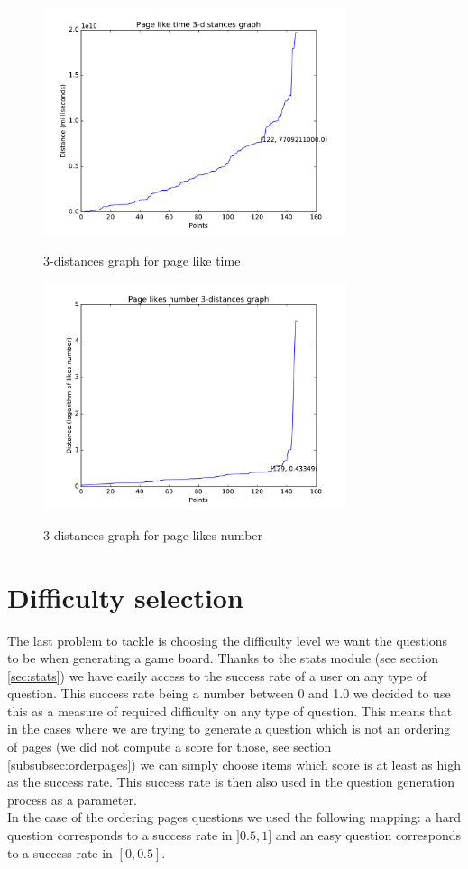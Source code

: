 \begin{figure}
\centering
{\includegraphics[width=3.5in]{images/page_like_time_knn.pdf}}
\caption{3-distances graph for page like time}
\label{fig:plikeTime}
\end{figure}
\begin{figure}
\centering
{\includegraphics[width=3.5in]{images/page_likes_number_knn.pdf}}
\caption{3-distances graph for page likes number}
\label{fig:plikesNumber}
\end{figure}

\section{Difficulty selection}
The last problem to tackle is choosing the difficulty level we want the questions to be when generating a game board. Thanks to the stats module (see section \ref{sec:stats}) we have easily access to the success rate of a user on any type of question. This success rate being a number between 0 and 1.0 we decided to use this as a measure of required difficulty on any type of question. This means that in the cases where we are trying to generate a question which is not an ordering of pages (we did not compute a score for those, see section \ref{subsubsec:orderpages}) we can simply choose items which score is at least as high as the success rate. This success rate is then also used in the question generation process as a parameter.\\
In the case of the ordering pages questions we used the following mapping: a hard question corresponds to a success rate in $]0.5, 1]$ and an easy question corresponds to a success rate in $[0, 0.5]$.